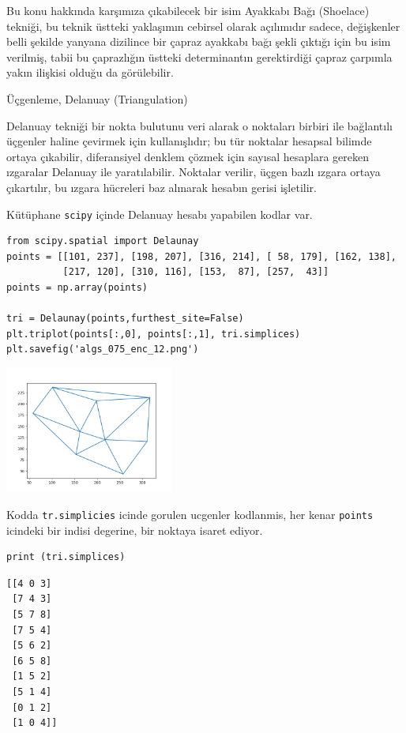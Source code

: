\documentclass[12pt,fleqn]{article}\usepackage{../../common}
\begin{document}
Bu konu hakkında karşımıza çıkabilecek bir isim Ayakkabı Bağı (Shoelace)
tekniği, bu teknik üstteki yaklaşımın cebirsel olarak açılımıdır sadece,
değişkenler belli şekilde yanyana dizilince bir çapraz ayakkabı bağı şekli
çıktığı için bu isim verilmiş, tabii bu çaprazlığın üstteki determinantın
gerektirdiği çapraz çarpımla yakın ilişkisi olduğu da görülebilir.

Üçgenleme, Delanuay (Triangulation)

Delanuay tekniği bir nokta bulutunu veri alarak o noktaları birbiri ile
bağlantılı üçgenler haline çevirmek için kullanışlıdır; bu tür noktalar hesapsal
bilimde ortaya çıkabilir, diferansiyel denklem çözmek için sayısal hesaplara
gereken ızgaralar Delanuay ile yaratılabilir. Noktalar verilir, üçgen bazlı
ızgara ortaya çıkartılır, bu ızgara hücreleri baz alınarak hesabın gerisi
işletilir.

Kütüphane \verb!scipy! içinde Delanuay hesabı yapabilen kodlar var.

\begin{verbatim}
from scipy.spatial import Delaunay
points = [[101, 237], [198, 207], [316, 214], [ 58, 179], [162, 138], 
          [217, 120], [310, 116], [153,  87], [257,  43]]
points = np.array(points)

tri = Delaunay(points,furthest_site=False)
plt.triplot(points[:,0], points[:,1], tri.simplices)
plt.savefig('algs_075_enc_12.png')
\end{verbatim}

\includegraphics[width=15em]{algs_075_enc_12.png}

Kodda \verb!tr.simplicies! icinde gorulen ucgenler kodlanmis, her kenar
\verb!points! icindeki bir indisi degerine, bir noktaya isaret ediyor.

\begin{verbatim}
print (tri.simplices)
\end{verbatim}

\begin{verbatim}
[[4 0 3]
 [7 4 3]
 [5 7 8]
 [7 5 4]
 [5 6 2]
 [6 5 8]
 [1 5 2]
 [5 1 4]
 [0 1 2]
 [1 0 4]]
\end{verbatim}
\end{document}
